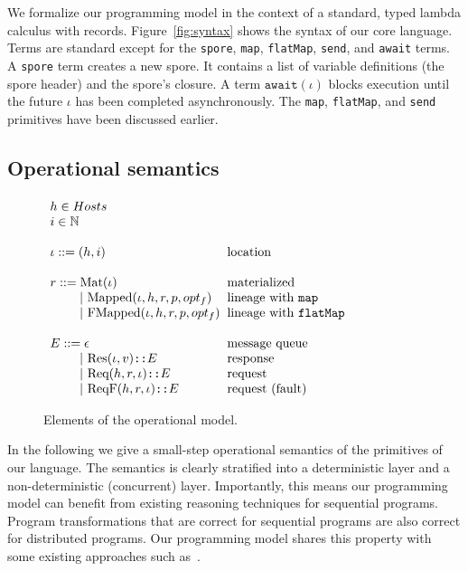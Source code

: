 \documentclass[preprint]{sigplanconf}
\theoremstyle{definition}
\theoremstyle{definition}
\newcommand{\gap}{\quad\quad}
\newcommand{\ba}{\begin{array}}
\newcommand{\ea}{\end{array}}
\begin{document}
We formalize our programming model in the context of a standard, typed lambda
calculus with records. Figure~\ref{fig:syntax} shows the syntax of our core
language. Terms are standard except for the \texttt{spore}, \texttt{map},
\texttt{flatMap}, \texttt{send}, and \texttt{await} terms. A \texttt{spore}
term creates a new spore. It contains a list of variable definitions (the spore
header) and the spore's closure. A term $\texttt{await}(\iota)$ blocks
execution until the future $\iota$ has been completed asynchronously. The
\texttt{map}, \texttt{flatMap}, and \texttt{send} primitives have been
discussed earlier.

\subsection{Operational semantics}
\label{sec:opsem}

\begin{figure}[ht!]
  \centering

  $\ba[t]{l@{\hspace{2mm}}l}
h \in Hosts &
\\
i \in \mathbb{N} &
\\
 & \\
\iota  ::=  (h, i)                               & \mbox{location}
\\
 & \\
r ::=     \text{Mat}(\iota) & \mbox{materialized}
\\
\gap ~|~  \text{Mapped}(\iota, h, r, p, opt_f)   & \mbox{lineage with \texttt{map}}
\\
\gap ~|~  \text{FMapped}(\iota, h, r, p, opt_f)  & \mbox{lineage with \texttt{flatMap}}
\\
 & \\
E      ::=  \epsilon & \mbox{message queue}
\\
\gap ~|~    \text{Res}(\iota, v) \texttt{::} E      & \mbox{response}
\\
\gap ~|~    \text{Req}(h, r, \iota) \texttt{::} E   & \mbox{request}
\\
\gap ~|~    \text{ReqF}(h, r, \iota) \texttt{::} E  & \mbox{request (fault)}
\\
  \ea$

  \vspace{1mm}
  \caption{Elements of the operational model.}
  \label{fig:elems-opsem}
  \vspace{1mm}
\end{figure}

In the following we give a small-step operational semantics of the primitives
of our language. The semantics is clearly stratified into a deterministic layer
and a non-deterministic (concurrent) layer. Importantly, this means our
programming model can benefit from existing reasoning techniques for sequential
programs. Program transformations that are correct for sequential programs are
also correct for distributed programs. Our programming model shares this
property with some existing approaches such as~\cite{ConcurrentHaskell}.
\end{document}
